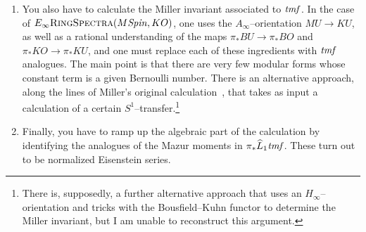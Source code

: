 \begin{enumerate}
    \item You also have to calculate the Miller invariant associated to \(\mathit{tmf}\).  In the case of \(E_\infty\normalfont\textsc{RingSpectra}(M\mathit{Spin}, KO)\), one uses the \(A_\infty\)--orientation \(MU \to KU\), as well as a rational understanding of the maps \(\pi_* BU \to \pi_* BO\) and \(\pi_* KO \to \pi_* KU\), and one must replace each of these ingredients with \(\mathit{tmf}\) analogues.  The main point is that there are very few modular forms whose constant term is a given Bernoulli number.  There is an alternative approach, along the lines of Miller's original calculation~\cite{MillerBernoulliNos}, that takes as input a calculation of a certain \(S^1\)--transfer.\footnote{There is, supposedly, a further alternative approach that uses an \(H_\infty\)--orientation and tricks with the Bousfield--Kuhn functor to determine the Miller invariant, but I am unable to reconstruct this argument.}
    \item Finally, you have to ramp up the algebraic part of the calculation by identifying the analogues of the Mazur moments in \(\pi_* \widehat L_1 \mathit{tmf}\).  These turn out to be normalized Eisenstein series.
\end{enumerate}









